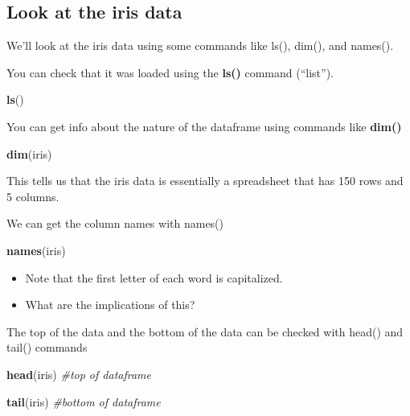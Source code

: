 \documentclass[]{book}
\newenvironment{Shaded}{\begin{snugshade}}{\end{snugshade}}
\newcommand{\KeywordTok}[1]{\textcolor[rgb]{0.13,0.29,0.53}{\textbf{#1}}}
\newcommand{\CommentTok}[1]{\textcolor[rgb]{0.56,0.35,0.01}{\textit{#1}}}
\newcommand{\NormalTok}[1]{#1}
\providecommand{\tightlist}{%
  \setlength{\itemsep}{0pt}\setlength{\parskip}{0pt}}
\theoremstyle{definition}
\theoremstyle{definition}
\theoremstyle{definition}
\theoremstyle{remark}
\begin{document}
\subsection{Look at the iris data}\label{look-at-the-iris-data}

We'll look at the iris data using some commands like ls(), dim(), and
names().

You can check that it was loaded using the \textbf{ls()} command
(``list'').

\begin{Shaded}
\begin{Highlighting}[]
\KeywordTok{ls}\NormalTok{()}
\end{Highlighting}
\end{Shaded}

You can get info about the nature of the dataframe using commands like
\textbf{dim()}

\begin{Shaded}
\begin{Highlighting}[]
\KeywordTok{dim}\NormalTok{(iris)}
\end{Highlighting}
\end{Shaded}

This tells us that the iris data is essentially a spreadsheet that has
150 rows and 5 columns.

We can get the column names with names()

\begin{Shaded}
\begin{Highlighting}[]
\KeywordTok{names}\NormalTok{(iris)}
\end{Highlighting}
\end{Shaded}

\begin{itemize}
\tightlist
\item
  Note that the first letter of each word is capitalized.\\
\item
  What are the implications of this?
\end{itemize}

The top of the data and the bottom of the data can be checked with
head() and tail() commands

\begin{Shaded}
\begin{Highlighting}[]
\KeywordTok{head}\NormalTok{(iris) }\CommentTok{#top of dataframe}

\KeywordTok{tail}\NormalTok{(iris) }\CommentTok{#bottom of dataframe}
\end{Highlighting}
\end{Shaded}
\end{document}
